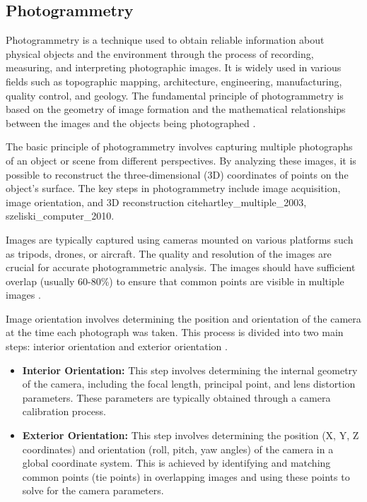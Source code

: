 \documentclass[12pt,a4paper,oneside]{report}
\begin{document}
\subsection{Photogrammetry}

Photogrammetry is a technique used to obtain reliable information about physical 
objects and the environment through the process of recording, measuring, and interpreting 
photographic images. It is widely used in various fields such as topographic mapping, 
architecture, engineering, manufacturing, quality control, and geology. The fundamental 
principle of photogrammetry is based on the geometry of image formation and the 
mathematical relationships between the images and the objects being photographed
\cite{hartley_multiple_2003,kraus_photogrammetry_2007}.

The basic principle of photogrammetry involves capturing multiple photographs of 
an object or scene from different perspectives. By analyzing these images, it is 
possible to reconstruct the three-dimensional (3D) coordinates of points on the 
object's surface. The key steps in photogrammetry include image acquisition, image 
orientation, and 3D reconstruction
cite{hartley_multiple_2003, szeliski_computer_2010}.

Images are typically captured using cameras mounted on various platforms such as 
tripods, drones, or aircraft. The quality and resolution of the images are crucial 
for accurate photogrammetric analysis. The images should have sufficient overlap 
(usually 60-80\%) to ensure that common points are visible in multiple images
\cite{colomina_unmanned_2014, nex_uav_2014}.

Image orientation involves determining the position and orientation of the camera 
at the time each photograph was taken. This process is divided into two main steps: 
interior orientation and exterior orientation 
\cite{brown_close-range_1971, triggs_bundle_2000}.

\begin{itemize}
    \item \textbf{Interior Orientation:} This step involves determining the internal 
    geometry of the camera, including the focal length, principal point, and lens 
    distortion parameters. These parameters are typically obtained through a camera 
    calibration process.
    \item \textbf{Exterior Orientation:} This step involves determining the position 
    (X, Y, Z coordinates) and orientation (roll, pitch, yaw angles) of the camera 
    in a global coordinate system. This is achieved by identifying and matching 
    common points (tie points) in overlapping images and using these points to solve 
    for the camera parameters.
\end{itemize}
\end{document}
